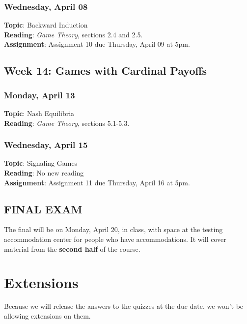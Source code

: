 \documentclass[
  letterpaper,
  DIV=11,
  numbers=noendperiod]{scrartcl}
\begin{document}
\subsubsection{Wednesday, April 08}\label{wednesday-april-08}

\textbf{Topic}: Backward Induction\\
\textbf{Reading}: \emph{Game Theory}, sections 2.4 and 2.5.\\
\textbf{Assignment}: Assignment 10 due Thursday, April 09 at 5pm.

\subsection{Week 14: Games with Cardinal
Payoffs}\label{week-14-games-with-cardinal-payoffs}

\subsubsection{Monday, April 13}\label{monday-april-13}

\textbf{Topic}: Nash Equilibria\\
\textbf{Reading}: \emph{Game Theory}, sections 5.1-5.3.

\subsubsection{Wednesday, April 15}\label{wednesday-april-15}

\textbf{Topic}: Signaling Games\\
\textbf{Reading}: No new reading\\
\textbf{Assignment}: Assignment 11 due Thursday, April 16 at 5pm.

\subsection{FINAL EXAM}\label{final-exam}

The final will be on Monday, April 20, in class, with space at the
testing accommodation center for people who have accommodations. It will
cover material from the \textbf{second half} of the course.

\section{Extensions}\label{extensions}

Because we will release the answers to the quizzes at the due date, we
won't be allowing extensions on them.
\end{document}
